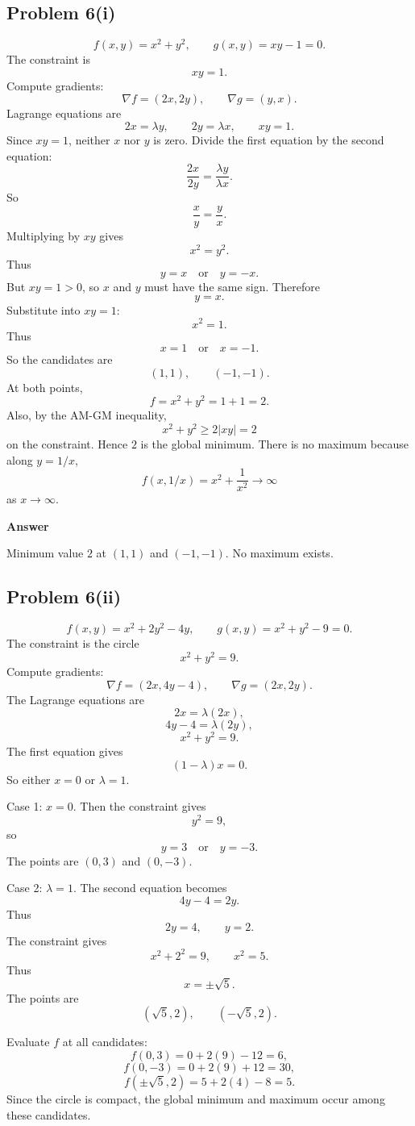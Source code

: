 \documentclass[11pt]{article}
\newenvironment{answerbox}[1]{\par\medskip\noindent\textcolor{linegreen}{\textbf{#1}}\par\smallskip}{\par\medskip}
\newcommand{\grad}{\nabla}
\begin{document}
\subsection*{Problem 6(i)}
\[
f(x,y)=x^2+y^2,
\qquad g(x,y)=xy-1=0.
\]
The constraint is
\[
xy=1.
\]
Compute gradients:
\[
\grad f=(2x,2y),
\qquad
\grad g=(y,x).
\]
Lagrange equations are
\[
2x=\lambda y,
\qquad
2y=\lambda x,
\qquad
xy=1.
\]
Since $xy=1$, neither $x$ nor $y$ is zero. Divide the first equation by the second equation:
\[
\frac{2x}{2y}=\frac{\lambda y}{\lambda x}.
\]
So
\[
\frac{x}{y}=\frac{y}{x}.
\]
Multiplying by $xy$ gives
\[
x^2=y^2.
\]
Thus
\[
y=x
\quad\text{or}\quad y=-x.
\]
But $xy=1>0$, so $x$ and $y$ must have the same sign. Therefore
\[
y=x.
\]
Substitute into $xy=1$:
\[
x^2=1.
\]
Thus
\[
x=1\quad\text{or}\quad x=-1.
\]
So the candidates are
\[
(1,1),
\qquad (-1,-1).
\]
At both points,
\[
f=x^2+y^2=1+1=2.
\]
Also, by the AM-GM inequality,
\[
x^2+y^2\ge2|xy|=2
\]
on the constraint. Hence $2$ is the global minimum. There is no maximum because along $y=1/x$,
\[
f(x,1/x)=x^2+\frac1{x^2}\to\infty
\]
as $x\to\infty$.

\begin{answerbox}{Answer}
Minimum value $2$ at $(1,1)$ and $(-1,-1)$.  No maximum exists.
\end{answerbox}

\subsection*{Problem 6(ii)}
\[
f(x,y)=x^2+2y^2-4y,
\qquad g(x,y)=x^2+y^2-9=0.
\]
The constraint is the circle
\[
x^2+y^2=9.
\]
Compute gradients:
\[
\grad f=(2x,4y-4),
\qquad \grad g=(2x,2y).
\]
The Lagrange equations are
\[
2x=\lambda(2x),
\]
\[
4y-4=\lambda(2y),
\]
\[
x^2+y^2=9.
\]
The first equation gives
\[
(1-\lambda)x=0.
\]
So either $x=0$ or $\lambda=1$.

Case 1: $x=0$.  Then the constraint gives
\[
y^2=9,
\]
so
\[
y=3\quad\text{or}\quad y=-3.
\]
The points are $(0,3)$ and $(0,-3)$.

Case 2: $\lambda=1$.  The second equation becomes
\[
4y-4=2y.
\]
Thus
\[
2y=4,
\qquad y=2.
\]
The constraint gives
\[
x^2+2^2=9,
\qquad x^2=5.
\]
Thus
\[
x=\pm\sqrt5.
\]
The points are
\[
(\sqrt5,2),
\qquad (-\sqrt5,2).
\]

Evaluate $f$ at all candidates:
\[
f(0,3)=0+2(9)-12=6,
\]
\[
f(0,-3)=0+2(9)+12=30,
\]
\[
f(\pm\sqrt5,2)=5+2(4)-8=5.
\]
Since the circle is compact, the global minimum and maximum occur among these candidates.
\end{document}
